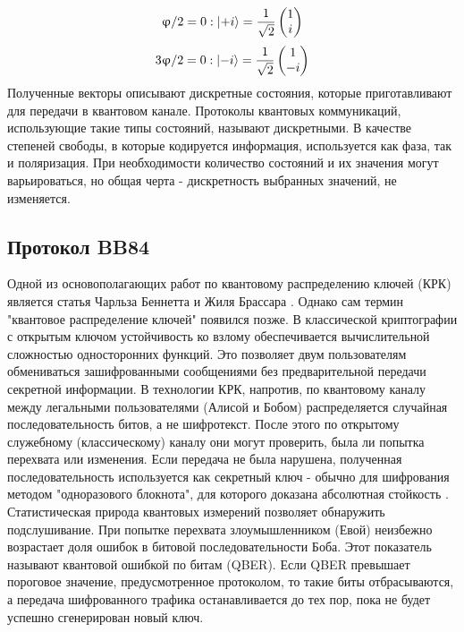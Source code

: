 \begin{equation}
  \upvarphi/2 = 0 : \lvert+i\rangle= \frac{1}{\sqrt{2}} \begin{pmatrix} 1 \\ i \end{pmatrix}
\label{eq:pi/2 phase vector}
\end{equation}
\begin{equation}
  3\upvarphi/2 = 0 : \lvert-i\rangle= \frac{1}{\sqrt{2}} \begin{pmatrix} 1 \\ -i \end{pmatrix}
\label{eq:3pi/2 phase vector}
\end{equation}
Полученные векторы описывают дискретные состояния, которые приготавливают для передачи в квантовом канале. Протоколы квантовых коммуникаций, использующие такие типы состояний, называют дискретными. В качестве степеней свободы, в которые кодируется информация, используется как фаза, так и поляризация. При необходимости количество состояний и их значения могут варьироваться, но общая черта - дискретность выбранных значений, не изменяется.
\subsection{Протокол BB84}\label{sec:ch1/sect2/DVQKD prot/bb84 ch1}
Одной из основополагающих работ по квантовому распределению ключей (КРК) является статья Чарльза Беннетта и Жиля Брассара \cite{bennett1984a}. Однако сам термин "квантовое распределение ключей" появился позже.
\newline В классической криптографии с открытым ключом устойчивость ко взлому обеспечивается вычислительной сложностью односторонних функций. Это позволяет двум пользователям обмениваться зашифрованными сообщениями без предварительной передачи секретной информации. В технологии КРК, напротив, по квантовому каналу между легальными пользователями (Алисой и Бобом) распределяется случайная последовательность битов, а не шифротекст. После этого по открытому служебному (классическому) каналу они могут проверить, была ли попытка перехвата или изменения. Если передача не была нарушена, полученная последовательность используется как секретный ключ - обычно для шифрования методом "одноразового блокнота", для которого доказана абсолютная стойкость \cite{arbekov2025}.
Статистическая природа квантовых измерений позволяет обнаружить подслушивание. При попытке перехвата злоумышленником (Евой) неизбежно возрастает доля ошибок в битовой последовательности Боба. Этот показатель называют квантовой ошибкой по битам (QBER).  Если QBER превышает пороговое значение, предусмотренное протоколом, то такие биты отбрасываются, а передача шифрованного трафика останавливается до тех пор, пока не будет успешно сгенерирован новый ключ.

